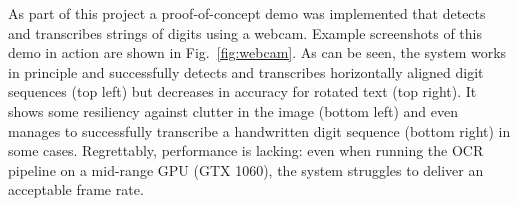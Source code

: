\documentclass[12pt]{article}
\newcommand\figref[1]{Fig.~\ref{fig:#1}}
\begin{document}
As part of this project a proof-of-concept demo was implemented that detects and transcribes
strings of digits using a webcam. Example screenshots of this demo in action are shown in \figref{webcam}.
As can be seen, the system works in principle and successfully detects and transcribes
horizontally aligned digit sequences (top left) but decreases in accuracy for rotated
text (top right). It shows some resiliency against clutter in the image (bottom left) and even manages
to successfully transcribe a handwritten digit sequence (bottom right) in some cases.
Regrettably, performance is lacking: even when running the OCR pipeline on a mid-range GPU (GTX 1060),
the system struggles to deliver an acceptable frame rate.

\begin{figure}[ht]
    \centering
\end{figure}
\end{document}
